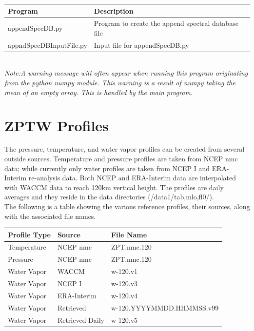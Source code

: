 \documentclass[12pt, letterpaper]{article}
\begin{document}
\begin{tabular}{ l l }
\textbf{Program} & \textbf{Description} \\
\hline
appendSpecDB.py         & Program to create the append spectral database file\\
appndSpecDBInputFile.py & Input file for appendSpecDB.py \\
\end{tabular} \\

\textit{Note:A warning message will often appear when running this program originating from the python numpy module. This warning is a result of numpy taking the mean of an empty array. This is handled by the main program.}

\section{ZPTW Profiles}
The pressure, temperature, and water vapor profiles can be created from several outside sources. Temperature and pressure profiles are taken from NCEP nmc data; while currently only water profiles are taken from NCEP I and ERA-Interim re-analysis data. Both NCEP and ERA-Interim data are interpolated with WACCM data to reach 120km vertical height. The profiles are daily averages and they reside in the data directories (/data1/tab,mlo,fl0/).\\

The following is a table showing the various reference profiles, their sources, along with the associated file names.\\

\begin{tabular}{ l l l }
\textbf{Profile Type} & \textbf{Source} & \textbf{File Name} \\
\hline
Temperature   & NCEP nmc          & ZPT.nmc.120 \\
Pressure      & NCEP nmc          & ZPT.nmc.120 \\
Water Vapor   & WACCM             & w-120.v1    \\
Water Vapor   & NCEP I            & w-120.v3    \\
Water Vapor   & ERA-Interim       & w-120.v4    \\
Water Vapor   & Retrieved         & w-120.YYYYMMDD.HHMMSS.v99    \\
Water Vapor   & Retrieved Daily   & w-120.v5    \\
\end{tabular} \\
\end{document}
